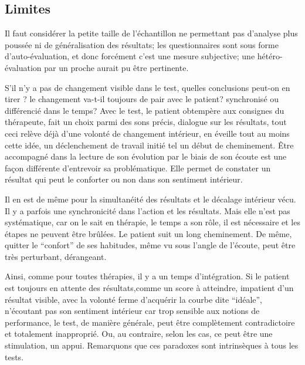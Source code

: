 \subsection{Limites}


  Il faut considérer la petite taille de l'échantillon ne permettant
  pas d'analyse plus poussée ni de généralisation des résultats; les
  questionnaires sont sous forme d'auto-évaluation, et donc forcément
  c'est une mesure subjective;  une hétéro-évaluation par un proche
  aurait pu être pertinente.

  
S'il n'y a pas de changement visible dans le test, quelles conclusions
peut-on en tirer ? le changement va-t-il toujours de pair avec le
patient? synchronisé ou différencié dans le temps?
Avec le test, le patient obtempère aux consignes du thérapeute, fait
un choix parmi des sons précis, dialogue sur les résultats, tout ceci
relève déjà d'une volonté de changement intérieur, en  éveille tout au
moins cette idée, un déclenchement de travail initié tel un début de cheminement.
Être accompagné dans la lecture de son évolution par le biais de
son écoute
est une façon différente d'entrevoir sa problématique. Elle permet de
constater un résultat qui  peut le conforter ou non dans son sentiment
intérieur.

Il en est de même pour la simultanéité des
résultats et le décalage intérieur vécu. Il y a parfois une
synchronicité dans l'action et les résultats. Mais elle n'est pas systématique,
car on le sait en thérapie, le temps a son rôle, il est
nécessaire et les étapes ne peuvent être brûlées. Le patient
suit un long
cheminement. %
De même, quitter le ``confort'' de ses habitudes, même vu sous
l'angle de l'écoute, peut être très perturbant, dérangeant.

Ainsi, comme pour toutes thérapies, il y a un temps d'intégration. Si
le patient est toujours en
attente des résultats,comme un score à atteindre, impatient d'un résultat visible,
avec la volonté ferme d'acquérir la courbe dite ``idéale'', n'écoutant pas son
sentiment intérieur car trop sensible aux notions de performance,
le test, de manière générale, peut être complètement
contradictoire et totalement inapproprié.
Ou, au contraire, selon les cas, ce peut être une stimulation, un appui.
Remarquons que ces paradoxes sont
intrinsèques à tous les tests.

